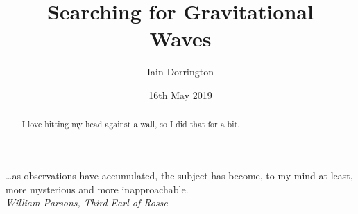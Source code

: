 \documentclass[11pt]{cuthesis}
\title{Searching for Gravitational \\
         Waves}
\author{Iain Dorrington}
\date{16th May 2019}
\begin{document}

\maketitle

\frontmatter

\begin{abstract}
    I love hitting my head against a wall, so I did that for a bit.
\end{abstract}

\declaration

\tableofcontents
\listoffigures
\listoftables

\begin{dedication}
    \ldots as observations have accumulated, the subject has become,
    to my mind at least, more mysterious and more inapproachable.\\
    \vspace{1cm}
    \hfill \textit{William Parsons, Third Earl of Rosse}
\end{dedication}


\mainmatter
\end{document}
